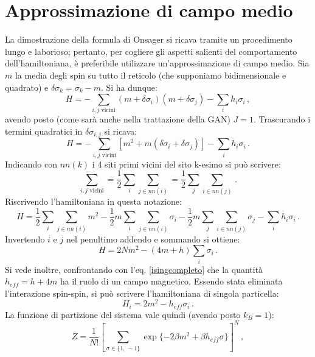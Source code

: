 \documentclass[Lau, noexaminfo, oneside]{sapthesis} %
\begin{document}
\section{Approssimazione di campo medio}
La dimostrazione della formula di Onsager si ricava tramite un procedimento lungo e laborioso; pertanto, per cogliere gli aspetti salienti del comportamento dell'hamiltoniana, è preferibile utilizzare un'approssimazione di campo medio\cite{meanfield}. Sia $m$ la media degli spin su tutto il reticolo (che supponiamo bidimensionale e quadrato) e $\delta\sigma_k = \sigma_k - m$. Si ha dunque:
\begin{equation}
H = -\sum_{i,j \text{ vicini}}  (m + \delta\sigma_i)(m + \delta\sigma_j) - \sum_i h_i \sigma_i \,,
\end{equation}
avendo posto (come sarà anche nella trattazione della GAN) $J=1$.
Trascurando i termini quadratici in $\delta\sigma_{i,j}$ si ricava:
\begin{equation}
H = - \sum_{i,j \text{ vicini}}  [m^2 + m (\delta\sigma_i + \delta\sigma_j)] - \sum_i h_i \sigma_i \,.
\end{equation}
Indicando con $nn(k)$ i 4 siti primi vicini del sito k-esimo si può scrivere:
\begin{equation}
\sum_{i,j \text{ vicini}} = \frac{1}{2} \sum_i \sum_{j\in nn(i)} = \frac{1}{2} \sum_j \sum_{i\in nn(j)} \,.
\end{equation}
Riscrivendo l'hamiltoniana in questa notazione:
\begin{equation}
H = \frac{1}{2} \sum_i \sum_{j\in nn(i)} m^2 - \frac{1}{2}m \sum_i \sum_{j\in nn(i)} \sigma_i - \frac{1}{2}m \sum_j \sum_{i\in nn(j)} \sigma_j - \sum_i h_i \sigma_i \,.
\end{equation}
Invertendo $i$ e $j$ nel penultimo addendo e sommando si ottiene:
\begin{equation}
H = 2 N m^2 - (4 m+h) \sum_i \sigma_i \,.
\end{equation}
Si vede inoltre, confrontando con l'eq. \eqref{isingcompleto} che la quantità $h_{eff} = h+4m$ ha il ruolo di un campo magnetico.
Essendo stata eliminata l'interazione spin-spin, si può scrivere l'hamiltoniana di singola particella:
\begin{equation}
H_i =  2  m^2 - h_{eff} \sigma_i \,.
\label{hamiltonianasingola}
\end{equation}
La funzione di partizione del sistema vale quindi (avendo posto $k_{B} = 1$):
\begin{equation}
Z = \frac{1}{N!} \left [ \sum_{\sigma \in \lbrace{1,\,-1}\rbrace} \exp \lbrace -2 \beta m^2 +  \beta h_{eff} \sigma \rbrace \right ] ^N \,,
\end{equation}
\end{document}
